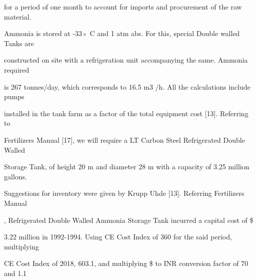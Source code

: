 \documentclass[a4paper,portrait,12pt]{article}
\begin{document}
\begin{flushleft}
for a period of one month to account for imports and procurement of the raw material.
\end{flushleft}


\begin{flushleft}
Ammonia is stored at -33◦ C and 1 atm abs. For this, special Double walled Tanks are
\end{flushleft}


\begin{flushleft}
constructed on site with a refrigeration unit accompanying the same. Ammonia required
\end{flushleft}


\begin{flushleft}
is 267 tonnes/day, which corresponds to 16.5 m3 /h. All the calculations include pumps
\end{flushleft}


\begin{flushleft}
installed in the tank farm as a factor of the total equipment cost [13]. Referring to
\end{flushleft}


\begin{flushleft}
Fertilizers Manual [17], we will require a LT Carbon Steel Refrigerated Double Walled
\end{flushleft}


\begin{flushleft}
Storage Tank, of height 20 m and diameter 28 m with a capacity of 3.25 million gallons.
\end{flushleft}


\begin{flushleft}
Suggestions for inventory were given by Krupp Uhde [13]. Referring Fertilizers Manual
\end{flushleft}


\begin{flushleft}
[17], Refrigerated Double Walled Ammonia Storage Tank incurred a capital cost of \$
\end{flushleft}


\begin{flushleft}
3.22 million in 1992-1994. Using CE Cost Index of 360 for the said period, multiplying
\end{flushleft}


\begin{flushleft}
CE Cost Index of 2018, 603.1, and multiplying \$ to INR conversion factor of 70 and 1.1
\end{flushleft}
\end{document}
